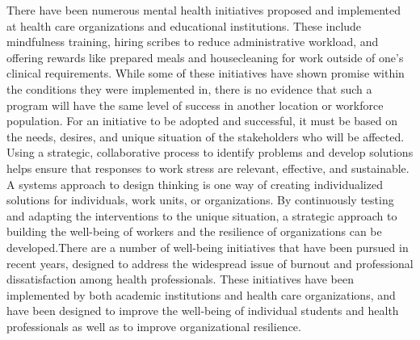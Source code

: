 \documentclass[12pt]{article}
\begin{document}
\indent

There have been numerous mental health initiatives proposed and implemented at health care organizations and educational institutions. These include mindfulness training, hiring scribes to reduce administrative workload, and offering rewards like prepared meals and housecleaning for work outside of one's clinical requirements. While some of these initiatives have shown promise within the conditions they were implemented in, there is no evidence that such a program will have the same level of success in another location or workforce population. For an initiative to be adopted and successful, it must be based on the needs, desires, and unique situation of the stakeholders who will be affected. Using a strategic, collaborative process to identify problems and develop solutions helps ensure that responses to work stress are relevant, effective, and sustainable. A systems approach to design thinking is one way of creating individualized solutions for individuals, work units, or organizations. By continuously testing and adapting the interventions to the unique situation, a strategic approach to building the well-being of workers and the resilience of organizations can be developed.There are a number of well-being initiatives that have been pursued in recent years, designed to address the widespread issue of burnout and professional dissatisfaction among health professionals. These initiatives have been implemented by both academic institutions and health care organizations, and have been designed to improve the well-being of individual students and health professionals as well as to improve organizational resilience.

\indent
\end{document}
